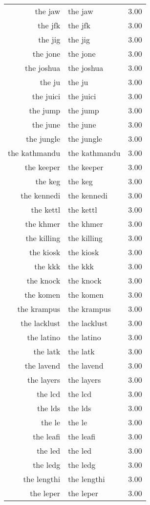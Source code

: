\begin{table}[ht]
\begin{tabular}{rlr}
  the jaw & the jaw & 3.00 \\ 
  the jfk & the jfk & 3.00 \\ 
  the jig & the jig & 3.00 \\ 
  the jone & the jone & 3.00 \\ 
  the joshua & the joshua & 3.00 \\ 
  the ju & the ju & 3.00 \\ 
  the juici & the juici & 3.00 \\ 
  the jump & the jump & 3.00 \\ 
  the june & the june & 3.00 \\ 
  the jungle & the jungle & 3.00 \\ 
  the kathmandu & the kathmandu & 3.00 \\ 
  the keeper & the keeper & 3.00 \\ 
  the keg & the keg & 3.00 \\ 
  the kennedi & the kennedi & 3.00 \\ 
  the kettl & the kettl & 3.00 \\ 
  the khmer & the khmer & 3.00 \\ 
  the killing & the killing & 3.00 \\ 
  the kiosk & the kiosk & 3.00 \\ 
  the kkk & the kkk & 3.00 \\ 
  the knock & the knock & 3.00 \\ 
  the komen & the komen & 3.00 \\ 
  the krampus & the krampus & 3.00 \\ 
  the lacklust & the lacklust & 3.00 \\ 
  the latino & the latino & 3.00 \\ 
  the latk & the latk & 3.00 \\ 
  the lavend & the lavend & 3.00 \\ 
  the layers & the layers & 3.00 \\ 
  the lcd & the lcd & 3.00 \\ 
  the lds & the lds & 3.00 \\ 
  the le & the le & 3.00 \\ 
  the leafi & the leafi & 3.00 \\ 
  the led & the led & 3.00 \\ 
  the ledg & the ledg & 3.00 \\ 
  the lengthi & the lengthi & 3.00 \\ 
  the leper & the leper & 3.00 \\ 

\end{tabular}
\end{table}
